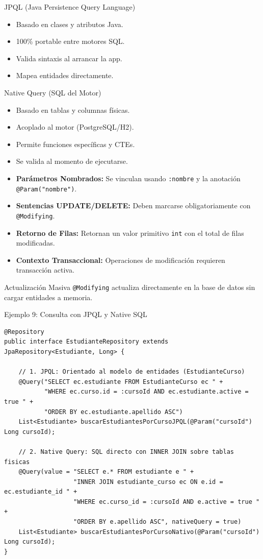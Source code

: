 \documentclass[aspectratio=169]{beamer}
\begin{document}
  {JPQL (Java Persistence Query Language)}
  {
    \begin{itemize}
      \item Basado en clases y atributos Java.
      \item 100\% portable entre motores SQL.
      \item Valida sintaxis al arrancar la app.
      \item Mapea entidades directamente.
    \end{itemize}
  }
  {Native Query (SQL del Motor)}
  {
    \begin{itemize}
      \item Basado en tablas y columnas f\'isicas.
      \item Acoplado al motor (PostgreSQL/H2).
      \item Permite funciones espec\'ificas y CTEs.
      \item Se valida al momento de ejecutarse.
    \end{itemize}
  }

  {
    \begin{itemize}
      \item \textbf{Par\'ametros Nombrados:} Se vinculan usando \texttt{:nombre} y la anotaci\'on \texttt{@Param("nombre")}.
      \item \textbf{Sentencias UPDATE/DELETE:} Deben marcarse obligatoriamente con \texttt{@Modifying}.
      \item \textbf{Retorno de Filas:} Retornan un valor primitivo \texttt{int} con el total de filas modificadas.
      \item \textbf{Contexto Transaccional:} Operaciones de modificaci\'on requieren transacci\'on activa.
    \end{itemize}
  }
  {Actualizaci\'on Masiva}
  {\texttt{@Modifying} actualiza directamente en la base de datos sin cargar entidades a memoria.}

\begin{frame}[fragile]{Ejemplo 9: Consulta con JPQL y Native SQL}
\begin{lstlisting}[style=SpringCodeStyle]
@Repository
public interface EstudianteRepository extends JpaRepository<Estudiante, Long> {

    // 1. JPQL: Orientado al modelo de entidades (EstudianteCurso)
    @Query("SELECT ec.estudiante FROM EstudianteCurso ec " +
           "WHERE ec.curso.id = :cursoId AND ec.estudiante.active = true " +
           "ORDER BY ec.estudiante.apellido ASC")
    List<Estudiante> buscarEstudiantesPorCursoJPQL(@Param("cursoId") Long cursoId);

    // 2. Native Query: SQL directo con INNER JOIN sobre tablas fisicas
    @Query(value = "SELECT e.* FROM estudiante e " +
                   "INNER JOIN estudiante_curso ec ON e.id = ec.estudiante_id " +
                   "WHERE ec.curso_id = :cursoId AND e.active = true " +
                   "ORDER BY e.apellido ASC", nativeQuery = true)
    List<Estudiante> buscarEstudiantesPorCursoNativo(@Param("cursoId") Long cursoId);
}
\end{lstlisting}
\end{frame}
\end{document}
